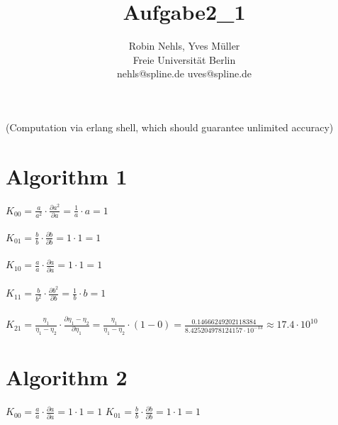 \documentclass[11pt,a4paper,notitlepage,onecolumn]{article}
\title{Aufgabe2\_1}
\author{Robin Nehls, Yves Müller\\
  Freie Universit\"at Berlin\\
  nehls@spline.de uves@spline.de }
\date{}
\begin{document}
\maketitle

\paragraph{}
{\scriptsize (Computation via erlang shell, which should guarantee 
unlimited accuracy)}

\section*{Algorithm 1}
\paragraph{}
$K_{00}=\frac{a}{a^2}\cdot\frac{\partial a^2}{\partial a}
=\frac{1}{a}\cdot a
=1$ 

\paragraph{}
$K_{01}=\frac{b}{b}\cdot\frac{\partial b}{\partial b}
=1\cdot1
=1$

\paragraph{}
$K_{10}=\frac{a}{a}\cdot\frac{\partial a}{\partial a}
=1\cdot1
=1$

\paragraph{}
$K_{11}=\frac{b}{b^2}\cdot\frac{\partial b^2}{\partial b}
=\frac{1}{b}\cdot b
=1$

\paragraph{}
$K_{21}=\frac{\eta_1}{\eta_1-\eta_2}
\cdot\frac{\partial \eta_1-\eta_2}{\partial \eta_1}
=\frac{\eta_1}{\eta_1-\eta_2}\cdot(1-0)
=\frac{0.14666249202118384}{8.425204978124157\cdot10^{-13}}
\approx 17.4 \cdot 10^{10}
$

\section*{Algorithm 2}
\paragraph{}
$K_{00}=\frac{a}{a}\cdot\frac{\partial a}{\partial a}
=1\cdot1
=1$       $K_{01}=\frac{b}{b}\cdot\frac{\partial b}{\partial b}
=1\cdot1
=1$
\end{document}
